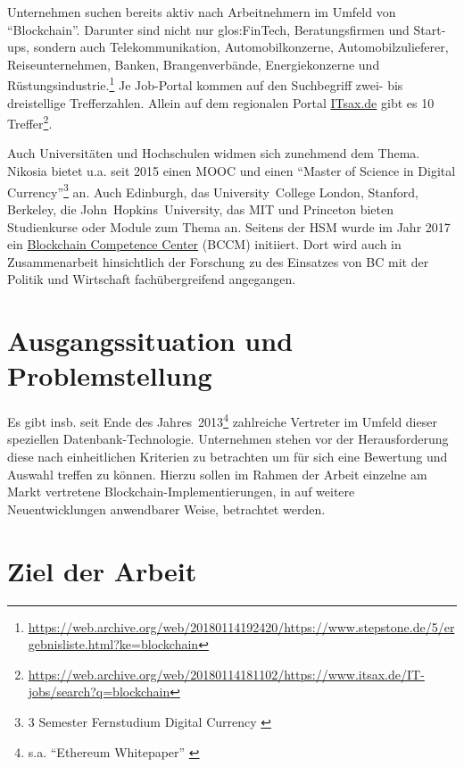 Unternehmen suchen bereits aktiv nach Arbeitnehmern im Umfeld von \enquote{Blockchain}. Darunter sind nicht nur \gls{glos:FinTech}, Beratungsfirmen und Start-ups, sondern auch Telekommunikation, Automobilkonzerne, Automobilzulieferer, Reiseunternehmen, Banken, Brangenverbände, Energiekonzerne und Rüstungsindustrie.\footnote{\url{https://web.archive.org/web/20180114192420/https://www.stepstone.de/5/ergebnisliste.html?ke=blockchain}} Je Job-Portal kommen auf den Suchbegriff zwei- bis dreistellige Trefferzahlen. Allein auf dem regionalen Portal \href{https://www.itsax.de/}{ITsax.de} gibt es 10 Treffer\footnote{\url{https://web.archive.org/web/20180114181102/https://www.itsax.de/IT-jobs/search?q=blockchain}}.

Auch Universitäten und Hochschulen widmen sich zunehmend dem Thema. Nikosia bietet u.a. seit 2015 einen \gls{MOOC} und einen \enquote{Master of Science in Digital Currency}\footnote{3 Semester Fernstudium Digital Currency \autocite{w:unic-master-dc}} an. Auch Edinburgh, das \mbox{University College} London, Stanford, Berkeley, die \mbox{John Hopkins University}, das \gls{MIT} und Princeton bieten Studienkurse oder Module zum Thema an. 
Seitens der \gls{HSM} wurde im Jahr 2017 ein \href{http://blockchain.hs-mittweida.de/}{Blockchain Competence Center} (BCCM) initiiert. Dort wird auch in Zusammenarbeit hinsichtlich der Forschung zu des Einsatzes von \gls{BC} mit der Politik und Wirtschaft fachübergreifend angegangen.

\newpage
\section{Ausgangssituation und Problemstellung}\label{sec:problemstellung}

Es gibt insb. seit Ende des Jahres~2013\footnote{s.a. \enquote{Ethereum Whitepaper} \autocite{p:ethereum}} zahlreiche Vertreter im Umfeld dieser speziellen Datenbank-Technologie.
Unternehmen stehen vor der Herausforderung diese nach einheitlichen Kriterien zu betrachten um für sich eine Bewertung und Auswahl treffen zu können.
Hierzu sollen im Rahmen der Arbeit einzelne am Markt vertretene Blockchain-Implementierungen, in auf weitere Neuentwicklungen anwendbarer Weise, betrachtet werden.

\section{Ziel der Arbeit}

